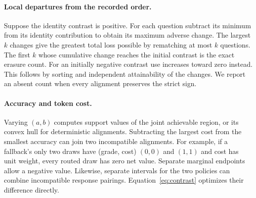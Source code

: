 \documentclass[11pt]{article}
\begin{document}
\paragraph{Local departures from the recorded order.} Suppose the identity contrast is positive. For each question subtract its minimum from its identity contribution to obtain its maximum adverse change. The largest $k$ changes give the greatest total loss possible by rematching at most $k$ questions. The first $k$ whose cumulative change reaches the initial contrast is the exact erasure count. For an initially negative contrast use increases toward zero instead. This follows by sorting and independent attainability of the changes. We report an absent count when every alignment preserves the strict sign.

\paragraph{Accuracy and token cost.} Varying $(a,b)$ computes support values of the joint achievable region, or its convex hull for deterministic alignments. Subtracting the largest cost from the smallest accuracy can join two incompatible alignments. For example, if a fallback's only two draws have (grade, cost) $(0,0)$ and $(1,1)$ and cost has unit weight, every routed draw has zero net value. Separate marginal endpoints allow a negative value. Likewise, separate intervals for the two policies can combine incompatible response pairings. Equation~\eqref{eq:contrast} optimizes their difference directly.


\end{document}
